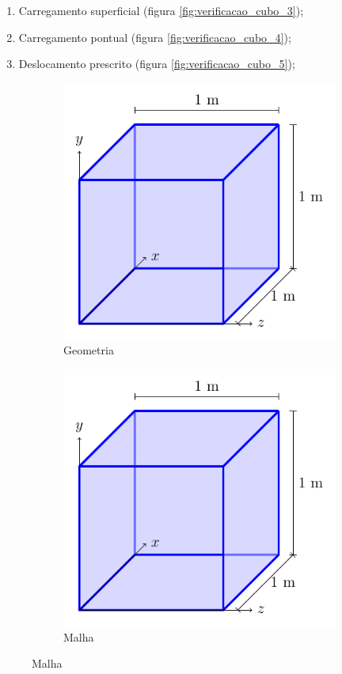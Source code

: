 \begin{enumerate}
    \item Carregamento superficial (figura \ref{fig:verificacao_cubo_3});
    \item Carregamento pontual (figura \ref{fig:verificacao_cubo_4});
    \item Deslocamento prescrito (figura \ref{fig:verificacao_cubo_5});
\end{enumerate}

\begin{figure}
    \centering
    \caption{O cubo unitário.}
    \begin{subfigure}[b]{0.45\textwidth}
        \centering
        \includegraphics[page=1]{Figuras/verificacao_cubo.pdf}
        \caption{Geometria}
        \label{fig:verificacao_cubo_1}
    \end{subfigure}
    \begin{subfigure}[b]{0.45\textwidth}
        \centering
        \includegraphics[page=2]{Figuras/verificacao_cubo.pdf}
        \caption{Malha}
        \label{fig:verificacao_cubo_2}
    \end{subfigure}
\end{figure}

